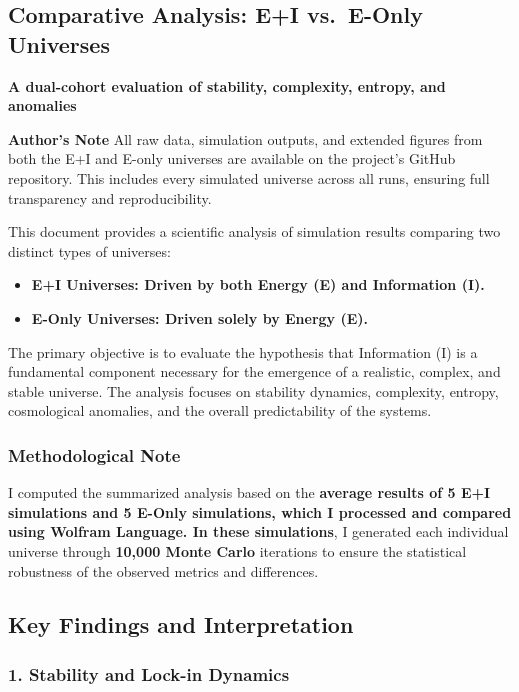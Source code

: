 \subsection{Comparative Analysis: E+I vs.~E-Only
Universes}\label{comparative-analysis-ei-vs.-e-only-universes}

\textbf{A dual-cohort evaluation of stability, complexity, entropy, and
anomalies}

\textbf{Author's Note}\textbar{} All raw data, simulation outputs, and
extended figures from both the E+I and E-only universes are available on
the project's GitHub repository. This includes every simulated universe
across all runs, ensuring full transparency and reproducibility.

This document provides a scientific analysis of simulation results
comparing two distinct types of universes:

\begin{itemize}
\item
  \textbf{E+I Universes: Driven by both Energy (E) and Information (I).}
\item
  \textbf{E-Only Universes: Driven solely by Energy (E).}
\end{itemize}

The primary objective is to evaluate the hypothesis that Information (I)
is a fundamental component necessary for the emergence of a realistic,
complex, and stable universe. The analysis focuses on stability
dynamics, complexity, entropy, cosmological anomalies, and the overall
predictability of the systems.

\subsubsection{Methodological Note}\label{methodological-note}

I computed the summarized analysis based on the \textbf{average results
of 5 E+I simulations and 5 E-Only simulations, which I processed and
compared using Wolfram Language. In these simulations}, I generated each
individual universe through \textbf{10,000 Monte Carlo} iterations to
ensure the statistical robustness of the observed metrics and
differences.

\subsection{Key Findings and
Interpretation}\label{key-findings-and-interpretation}

\subsubsection{1. Stability and Lock-in
Dynamics}\label{stability-and-lock-in-dynamics}

